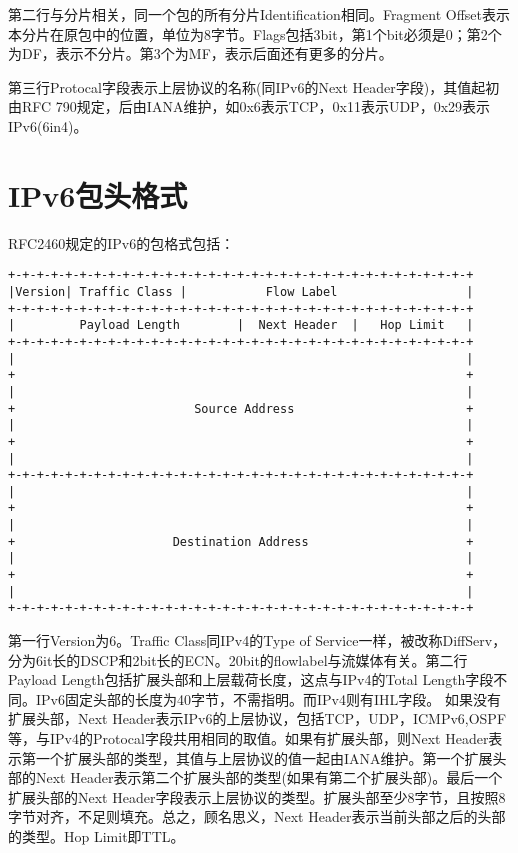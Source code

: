 第二行与分片相关，同一个包的所有分片Identification相同。Fragment Offset表示本分片在原包中的位置，单位为8字节。Flags包括3bit，第1个bit必须是0；第2个为DF，表示不分片。第3个为MF，表示后面还有更多的分片。

第三行Protocal字段表示上层协议的名称(同IPv6的Next Header字段)，其值起初由RFC 790规定，后由IANA维护，如0x6表示TCP，0x11表示UDP，0x29表示IPv6(6in4)。

\section{IPv6包头格式}
RFC2460规定的IPv6的包格式包括：

\begin{center}
    \begin{lstlisting}
+-+-+-+-+-+-+-+-+-+-+-+-+-+-+-+-+-+-+-+-+-+-+-+-+-+-+-+-+-+-+-+-+
|Version| Traffic Class |           Flow Label                  |
+-+-+-+-+-+-+-+-+-+-+-+-+-+-+-+-+-+-+-+-+-+-+-+-+-+-+-+-+-+-+-+-+
|         Payload Length        |  Next Header  |   Hop Limit   |
+-+-+-+-+-+-+-+-+-+-+-+-+-+-+-+-+-+-+-+-+-+-+-+-+-+-+-+-+-+-+-+-+
|                                                               |
+                                                               +
|                                                               |
+                         Source Address                        +
|                                                               |
+                                                               +
|                                                               |
+-+-+-+-+-+-+-+-+-+-+-+-+-+-+-+-+-+-+-+-+-+-+-+-+-+-+-+-+-+-+-+-+
|                                                               |
+                                                               +
|                                                               |
+                      Destination Address                      +
|                                                               |
+                                                               +
|                                                               |
+-+-+-+-+-+-+-+-+-+-+-+-+-+-+-+-+-+-+-+-+-+-+-+-+-+-+-+-+-+-+-+-+

\end{lstlisting}
\end{center}

第一行Version为6。Traffic Class同IPv4的Type of Service一样，被改称DiffServ，分为6it长的DSCP和2bit长的ECN。20bit的flowlabel与流媒体有关。第二行Payload Length包括扩展头部和上层载荷长度，这点与IPv4的Total Length字段不同。IPv6固定头部的长度为40字节，不需指明。而IPv4则有IHL字段。
如果没有扩展头部，Next Header表示IPv6的上层协议，包括TCP，UDP，ICMPv6,OSPF等，与IPv4的Protocal字段共用相同的取值。如果有扩展头部，则Next Header表示第一个扩展头部的类型，其值与上层协议的值一起由IANA维护。第一个扩展头部的Next Header表示第二个扩展头部的类型(如果有第二个扩展头部)。最后一个扩展头部的Next Header字段表示上层协议的类型。扩展头部至少8字节，且按照8字节对齐，不足则填充。总之，顾名思义，Next Header表示当前头部之后的头部的类型。Hop Limit即TTL。


